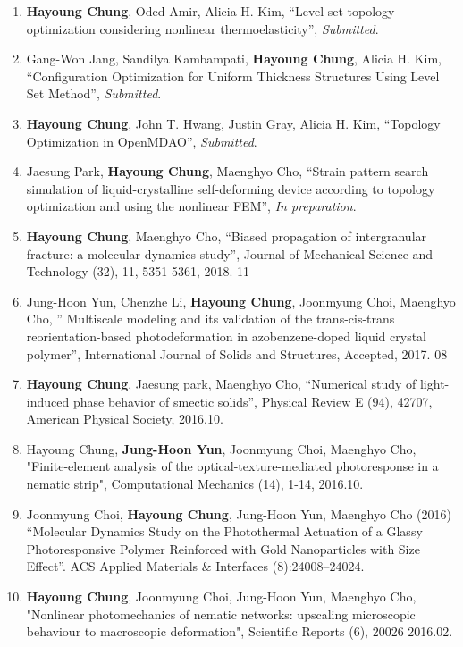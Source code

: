 \documentclass[margin, 10pt]{res} %
\begin{document}
\begin{resume}
\begin{enumerate}
    \item \textbf{Hayoung Chung}, Oded Amir, Alicia H. Kim, “Level-set topology optimization considering nonlinear thermoelasticity”, \textit{Submitted}. %
    \item Gang-Won Jang, Sandilya Kambampati, \textbf{Hayoung Chung}, Alicia H. Kim, “Configuration Optimization for Uniform Thickness Structures Using Level Set Method”, \textit{Submitted}.
    \item \textbf{Hayoung Chung}, John T. Hwang, Justin Gray, Alicia H. Kim, “Topology Optimization in OpenMDAO”, \textit{Submitted}.
    \item Jaesung Park, \textbf{Hayoung Chung}, Maenghyo Cho, “Strain pattern search simulation of liquid-crystalline self-deforming device according to topology optimization and using the nonlinear FEM”, \textit{In preparation}. 
    \item \textbf{Hayoung Chung}, Maenghyo Cho, “Biased propagation of intergranular fracture: a molecular dynamics study”, Journal of Mechanical Science and Technology (32), 11, 5351-5361, 2018. 11 %
    \item Jung-Hoon Yun, Chenzhe Li, \textbf{Hayoung Chung}, Joonmyung Choi, Maenghyo Cho, ” Multiscale modeling and its validation of the trans-cis-trans reorientation-based photodeformation in azobenzene-doped liquid crystal polymer”, International Journal of Solids and Structures, Accepted, 2017. 08 %
    \item \textbf{Hayoung Chung}, Jaesung park, Maenghyo Cho, “Numerical study of light-induced phase behavior of smectic solids”, Physical Review E (94), 42707, American Physical Society, 2016.10.  %
    \item Hayoung Chung, \textbf{Jung-Hoon Yun}, Joonmyung Choi, Maenghyo Cho, "Finite-element analysis of the optical-texture-mediated photoresponse in a nematic strip", Computational Mechanics (14), 1-14, 2016.10. %
    \item Joonmyung Choi, \textbf{Hayoung Chung}, Jung-Hoon Yun, Maenghyo Cho (2016) “Molecular Dynamics Study on the Photothermal Actuation of a Glassy Photoresponsive Polymer Reinforced with Gold Nanoparticles with Size Effect”. ACS Applied Materials \& Interfaces (8):24008–24024.  %
    \item \textbf{Hayoung Chung}, Joonmyung Choi, Jung-Hoon Yun, Maenghyo Cho, "Nonlinear photomechanics of nematic networks: upscaling microscopic behaviour to macroscopic deformation", Scientific Reports (6), 20026 2016.02. %

\end{enumerate}
\end{resume}
\end{document}
